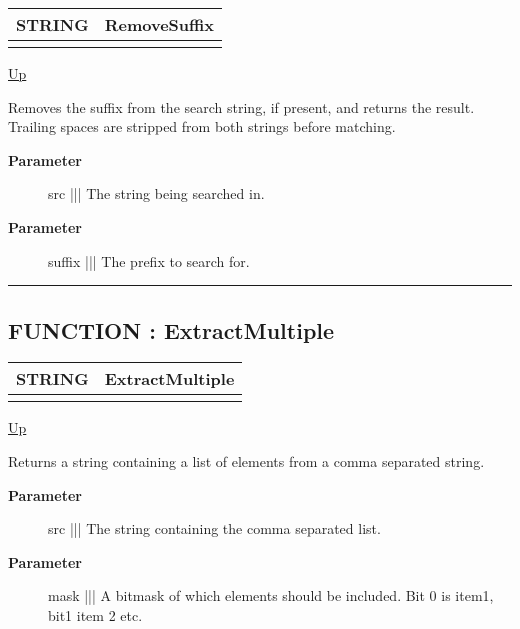 {\renewcommand{\arraystretch}{1.5}
\begin{tabularx}{\textwidth}{|>{\raggedright\arraybackslash}l|X|}
\hline
\hspace{0pt}STRING & RemoveSuffix \\
\hline
\multicolumn{2}{|>{\raggedright\arraybackslash}X|}{\hspace{0pt}(STRING src, STRING suffix)} \\
\hline
\end{tabularx}
}

\hyperlink{ecldoc:Str}{Up}

\par
Removes the suffix from the search string, if present, and returns the result. Trailing spaces are stripped from both strings before matching.

\par
\begin{description}
\item [\textbf{Parameter}] src ||| The string being searched in.
\item [\textbf{Parameter}] suffix ||| The prefix to search for.
\end{description}

\rule{\textwidth}{0.4pt}
\subsection*{FUNCTION : ExtractMultiple}
\hypertarget{ecldoc:str.extractmultiple}{}

{\renewcommand{\arraystretch}{1.5}
\begin{tabularx}{\textwidth}{|>{\raggedright\arraybackslash}l|X|}
\hline
\hspace{0pt}STRING & ExtractMultiple \\
\hline
\multicolumn{2}{|>{\raggedright\arraybackslash}X|}{\hspace{0pt}(STRING src, UNSIGNED8 mask)} \\
\hline
\end{tabularx}
}

\hyperlink{ecldoc:Str}{Up}

\par
Returns a string containing a list of elements from a comma separated string.

\par
\begin{description}
\item [\textbf{Parameter}] src ||| The string containing the comma separated list.
\item [\textbf{Parameter}] mask ||| A bitmask of which elements should be included. Bit 0 is item1, bit1 item 2 etc.
\end{description}

